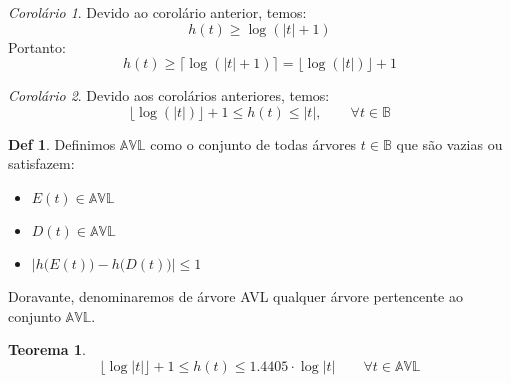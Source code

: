 \documentclass[a4paper,11pt]{article}
\theoremstyle{definition} \newtheorem{definicao}{Def}
\theoremstyle{definition} \newtheorem{exemplo}{Exemplo}
\theoremstyle{plain}      \newtheorem{teorema}{Teorema}
\theoremstyle{remark}     \newtheorem*{corolario}{Corol\'{a}rio}
\begin{document}
\begin{corolario}
Devido ao corol\'{a}rio anterior, temos:
\begin{equation*}
h(t) \geq \log(|t|+1)
\end{equation*}
Portanto:
\begin{equation*}
h(t) \geq \lceil \log(|t| + 1) \rceil = \lfloor \log(|t|) \rfloor + 1
\end{equation*}
\end{corolario}

\begin{corolario}
Devido aos corol\'{a}rios anteriores, temos:
\begin{equation*}
\lfloor \log(|t|) \rfloor + 1 \leq h(t) \leq |t|, \qquad
\forall t \in \mathbb{B}
\end{equation*}
\end{corolario}

\begin{definicao}
Definimos $\mathbb{AVL}$ como o conjunto de todas \'{a}rvores
$t \in \mathbb{B}$ que s\~{a}o vazias ou satisfazem: \\
\begin{itemize}
\item $E(t) \in \mathbb{AVL}$
\item $D(t) \in \mathbb{AVL}$
\item $\bigg|h\Big(E(t)\Big) - h\Big(D(t)\Big)\bigg| \leq 1$
\end{itemize}
Doravante, denominaremos de \'{a}rvore AVL qualquer \'{a}rvore
pertencente ao conjunto $\mathbb{AVL}$.
\end{definicao}

\begin{teorema}
\begin{equation*}
\lfloor \log|t| \rfloor + 1 \leq h(t) \leq 1.4405 \cdot \log|t|
\qquad \forall t \in \mathbb{AVL}
\end{equation*}
\end{teorema}
\end{document}
